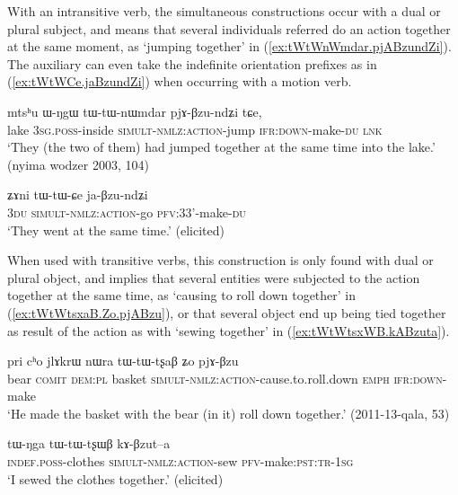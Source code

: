 
With an intransitive verb, the simultaneous constructions occur with a dual or plural subject, and means that several individuals referred do an action together at the same moment, as  `jumping together' in (\ref{ex:tWtWnWmdar.pjABzundZi}). The auxiliary  can even take the indefinite orientation prefixes   as in (\ref{ex:tWtWCe.jaBzundZi}) when occurring with a motion verb.

\begin{exe}
\ex \label{ex:tWtWnWmdar.pjABzundZi}
\gll  mtsʰu ɯ-ŋgɯ tɯ-tɯ-nɯmdar pjɤ-βzu-ndʑi tɕe, \\
 lake \textsc{3sg}.\textsc{poss}-inside \textsc{simult}-\textsc{nmlz}:\textsc{action}-jump \textsc{ifr}:\textsc{down}-make-\textsc{du} \textsc{lnk} \\
 \glt `They (the two of them) had jumped together at the same time into the lake.' (nyima wodzer 2003, 104)
\end{exe}

\begin{exe}
\ex \label{ex:tWtWCe.jaBzundZi}
\gll ʑɤni tɯ-tɯ-ɕe ja-βzu-ndʑi \\
\textsc{3du} \textsc{simult}-\textsc{nmlz}:\textsc{action}-go \textsc{pfv}:3\fl{}3'-make-\textsc{du} \\
\glt `They went at the same time.' (elicited)
 \end{exe}

 When used with transitive verbs, this construction is only found with dual or plural object, and implies that several entities were subjected to the action together at the same time, as  `causing to roll down together' in (\ref{ex:tWtWtsxaB.Zo.pjABzu}), or that several object end up being tied together as result of the action as with  `sewing together' in (\ref{ex:tWtWtsxWB.kABzuta}).
 
\begin{exe}
\ex \label{ex:tWtWtsxaB.Zo.pjABzu}
\gll  pri cʰo jlɤkrɯ nɯra tɯ-tɯ-tʂaβ ʑo pjɤ-βzu  \\
 bear \textsc{comit} \textsc{dem}:\textsc{pl}  basket  \textsc{simult}-\textsc{nmlz}:\textsc{action}-cause.to.roll.down \textsc{emph} \textsc{ifr}:\textsc{down}-make \\
\glt `He made the basket with the bear (in it) roll down together.' (2011-13-qala, 53) 
\end{exe}

\begin{exe}
\ex \label{ex:tWtWtsxWB.kABzuta}
\gll   tɯ-ŋga tɯ-tɯ-tʂɯβ kɤ-βzut--a \\
\textsc{indef}.\textsc{poss}-clothes \textsc{simult}-\textsc{nmlz}:\textsc{action}-sew \textsc{pfv}-make:\textsc{pst}:\textsc{tr}-\textsc{1sg} \\
\glt `I sewed the clothes together.' (elicited)
\end{exe}
  

